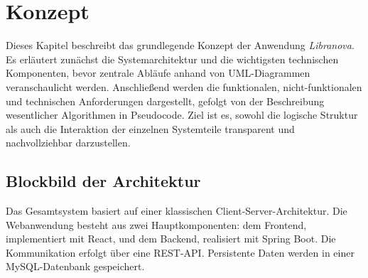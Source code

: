 \chapter{Konzept}

Dieses Kapitel beschreibt das grundlegende Konzept der Anwendung \textit{Libranova}. Es erläutert zunächst die Systemarchitektur und die wichtigsten technischen Komponenten, bevor zentrale Abläufe anhand von UML-Diagrammen veranschaulicht werden. Anschließend werden die funktionalen, nicht-funktionalen und technischen Anforderungen dargestellt, gefolgt von der Beschreibung wesentlicher Algorithmen in Pseudocode. Ziel ist es, sowohl die logische Struktur als auch die Interaktion der einzelnen Systemteile transparent und nachvollziehbar darzustellen.

\section{Blockbild der Architektur}

Das Gesamtsystem basiert auf einer klassischen Client-Server-Architektur. Die Webanwendung besteht aus zwei Hauptkomponenten: dem Frontend, implementiert mit React, und dem Backend, realisiert mit Spring Boot. Die Kommunikation erfolgt über eine REST-API. Persistente Daten werden in einer MySQL-Datenbank gespeichert.

